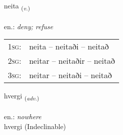 \documentclass[frontgrid, backgrid]{flacards}\usepackage[]{graphicx}\usepackage[]{xcolor}
\begin{document}
\renewcommand{\flhead}{\vskip5pt \fboxsep=0pt {\small\bfseries\footnotesize Sagnorð | Verb}}
\renewcommand{\fcfoot}{\vskip5pt \fboxsep=0pt \hspace{2pt}{\small\bfseries\footnotesize 2K}}

\renewcommand{\blhead}{\vskip5pt {\small\bfseries\footnotesize Sagnorð | Verb }}
\renewcommand{\bcfoot}{\vskip5pt \hspace{2pt}{\small\bfseries\footnotesize 2K}}


{neita \small{\textsubscript{(\textit{v.})}} \\[1ex] %
\textphonetic{[neiːta]} \\
en.: \emph{deny; refuse} \\  [2ex]
\renewcommand*{\arraystretch}{0.8}
\begin{tabular}{p{1cm}l}
\textsc{1sg}: & neita -- neitaði -- neitað \\ 
\textsc{2sg}: & neitar -- neitaðir -- neitað \\ 
\textsc{3sg}: & neitar -- neitaði -- neitað \\ 
\end{tabular}
}


\renewcommand{\flhead}{\vskip5pt \fboxsep=0pt {\small\bfseries\footnotesize Atviksorð | Adverb}}
\renewcommand{\fcfoot}{\vskip5pt \fboxsep=0pt \hspace{2pt}{\small\bfseries\footnotesize 2K}}

\renewcommand{\blhead}{\vskip5pt {\small\bfseries\footnotesize Atviksorð | Adverb }}
\renewcommand{\bcfoot}{\vskip5pt \hspace{2pt}{\small\bfseries\footnotesize 2K}}


{hvergi \small{\textsubscript{(\textit{adv.})}} \\[1ex]
\textphonetic{[kʰvɛrcɪ]} \\
en.: \emph{nowhere} \\  [2ex]
hvergi (Indeclinable)}

\renewcommand{\flhead}{\vskip5pt \fboxsep=0pt {\small\bfseries\footnotesize Lýsingarorð | Adjective}}
\renewcommand{\fcfoot}{\vskip5pt \fboxsep=0pt \hspace{2pt}{\small\bfseries\footnotesize 2K}}
\end{document}
